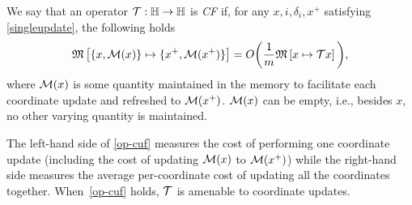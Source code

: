 \begin{definition}[CF operator]
 We say that an operator ${\mathcal{T}}:\mathbb{H}\to\mathbb{H}$ is \emph{CF} if, for any $x,i,\delta_i,x^+$ satisfying \eqref{singleupdate}, the following holds
\begin{equation}\label{op-cuf} \nops{\{x,\cM(x)\}}{\{x^+,\cM(x^+)\}}= O\bigg(\frac{1}{m}\nops{x}{\cT x}\bigg),
\end{equation}
where ${\mathcal{M}}(x)$ is some quantity maintained in the memory to facilitate each coordinate update and refreshed to ${\mathcal{M}}(x^+)$. ${\mathcal{M}}(x)$ can be empty, i.e., besides $x$, no other varying quantity is maintained.
\end{definition}


The left-hand side of \eqref{op-cuf} measures the cost of performing one coordinate update (including the cost of updating ${\mathcal{M}}(x)$ to ${\mathcal{M}}(x^+)$)  while the right-hand side measures the average per-coordinate cost of updating all the coordinates together. When~\eqref{op-cuf} holds, ${\mathcal{T}}$ is amenable to coordinate updates.

